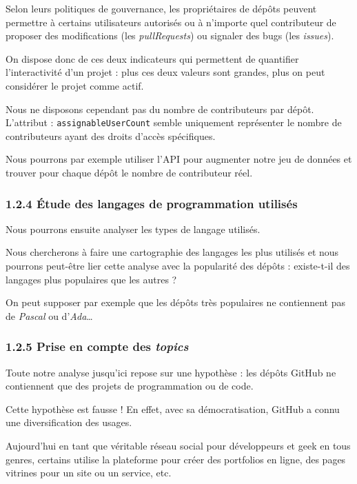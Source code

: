 \documentclass[
]{article}
\begin{document}
Selon leurs politiques de gouvernance, les propriétaires de dépôts
peuvent permettre à certains utilisateurs autorisés ou à n'importe quel
contributeur de proposer des modifications (les \emph{pullRequests}) ou
signaler des bugs (les \emph{issues}).

On dispose donc de ces deux indicateurs qui permettent de quantifier
l'interactivité d'un projet : plus ces deux valeurs sont grandes, plus
on peut considérer le projet comme actif.

Nous ne disposons cependant pas du nombre de contributeurs par dépôt.
L'attribut : \texttt{assignableUserCount} semble uniquement représenter
le nombre de contributeurs ayant des droits d'accès spécifiques.

Nous pourrons par exemple utiliser l'API pour augmenter notre jeu de
données et trouver pour chaque dépôt le nombre de contributeur réel.

\subsubsection{1.2.4 Étude des langages de programmation
utilisés}\label{uxe9tude-des-langages-de-programmation-utilisuxe9s}

Nous pourrons ensuite analyser les types de langage utilisés.

Nous chercherons à faire une cartographie des langages les plus utilisés
et nous pourrons peut-être lier cette analyse avec la popularité des
dépôts : existe-t-il des langages plus populaires que les autres ?

On peut supposer par exemple que les dépôts très populaires ne
contiennent pas de \emph{Pascal} ou d'\emph{Ada}\ldots{}

\subsubsection{\texorpdfstring{1.2.5 Prise en compte des
\emph{topics}}{1.2.5 Prise en compte des topics}}\label{prise-en-compte-des-topics}

Toute notre analyse jusqu'ici repose sur une hypothèse : les dépôts
GitHub ne contiennent que des projets de programmation ou de code.

Cette hypothèse est fausse ! En effet, avec sa démocratisation, GitHub a
connu une diversification des usages.

Aujourd'hui en tant que véritable réseau social pour développeurs et
geek en tous genres, certains utilise la plateforme pour créer des
portfolios en ligne, des pages vitrines pour un site ou un service, etc.
\end{document}
